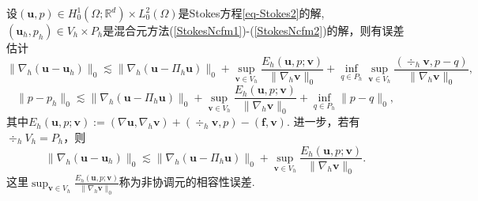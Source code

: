 \begin{theorem}\label{thm:stokesncfmerrorestimate}
设$(\boldsymbol{u}, p)\in H_0^{1}(\Omega; \mathbb{R}^{d})\times L_{0}^{2}(\Omega)$是Stokes方程\eqref{eq-Stokes2}的解, $(\boldsymbol{u}_h, p_h)\in V_h\times P_h$是混合元方法(\ref{StokesNcfm1})-(\ref{StokesNcfm2})的解，则有误差估计
\begin{equation}\label{stokesncfmerroruh}	
\|\nabla_h(\boldsymbol{u}-\boldsymbol{u}_h)\|_0\lesssim \|\nabla_h(\boldsymbol{u}-\Pi_{h}\boldsymbol{u})\|_0 + \sup_{\boldsymbol{v}\in V_h}\frac{E_h(\boldsymbol{u},p;\boldsymbol{v})}{\|\nabla_h\boldsymbol{v}\|_0} + \inf_{q\in P_h}\sup_{\boldsymbol{v}\in V_h}\frac{(\div_h\boldsymbol{v},p-q)}{\|\nabla_h\boldsymbol{v}\|_0},
\end{equation}
\begin{equation}\label{stokesncfmerrorph}	
\|p-p_h\|_0\lesssim \|\nabla_h(\boldsymbol{u}-\Pi_{h}\boldsymbol{u})\|_0 + \sup_{\boldsymbol{v}\in V_h}\frac{E_h(\boldsymbol{u},p;\boldsymbol{v})}{\|\nabla_h\boldsymbol{v}\|_0} + \inf_{q\in P_h}\|p-q\|_0,
\end{equation}
其中$E_h(\boldsymbol{u},p;\boldsymbol{v}):=(\nabla\boldsymbol{u}, \nabla_h\boldsymbol{v}) + (\div_h\boldsymbol{v}, p) -(\boldsymbol{f},\boldsymbol{v})$.
进一步，若有$\div_h V_h=P_h$，则
\begin{equation}\label{stokesncfmerroruhu}	
\|\nabla_h(\boldsymbol{u}-\boldsymbol{u}_h)\|_0\lesssim \|\nabla_h(\boldsymbol{u}-\Pi_{h}\boldsymbol{u})\|_0+ \sup_{\boldsymbol{v}\in V_h}\frac{E_h(\boldsymbol{u},p;\boldsymbol{v})}{\|\nabla_h\boldsymbol{v}\|_0}.
\end{equation}
这里$\displaystyle\sup_{\boldsymbol{v}\in V_h}\frac{E_h(\boldsymbol{u},p;\boldsymbol{v})}{\|\nabla_h\boldsymbol{v}\|_0}$称为非协调元的相容性误差.
\end{theorem}
